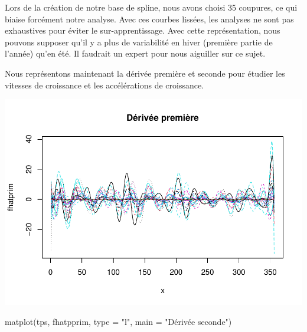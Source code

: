 \documentclass[
]{article}
\newenvironment{Shaded}{\begin{snugshade}}{\end{snugshade}}
\newcommand{\AttributeTok}[1]{\textcolor[rgb]{0.77,0.63,0.00}{#1}}
\newcommand{\CommentTok}[1]{\textcolor[rgb]{0.56,0.35,0.01}{\textit{#1}}}
\newcommand{\DecValTok}[1]{\textcolor[rgb]{0.00,0.00,0.81}{#1}}
\newcommand{\FunctionTok}[1]{\textcolor[rgb]{0.00,0.00,0.00}{#1}}
\newcommand{\NormalTok}[1]{#1}
\newcommand{\OtherTok}[1]{\textcolor[rgb]{0.56,0.35,0.01}{#1}}
\newcommand{\SpecialCharTok}[1]{\textcolor[rgb]{0.00,0.00,0.00}{#1}}
\newcommand{\StringTok}[1]{\textcolor[rgb]{0.31,0.60,0.02}{#1}}
\begin{document}
Lors de la création de notre base de spline, nous avons choisi 35
coupures, ce qui biaise forcément notre analyse. Avec ces courbes
lissées, les analyses ne sont pas exhaustives pour éviter le
sur-apprentissage. Avec cette représentation, nous pouvons supposer
qu'il y a plus de variabilité en hiver (première partie de l'année)
qu'en été. Il faudrait un expert pour nous aiguiller sur ce sujet.

Nous représentons maintenant la dérivée première et seconde pour étudier
les vitesses de croissance et les accélérations de croissance.

\begin{Shaded}
\end{Shaded}

\includegraphics{Projet_CHESNAIS_GUIBERT_files/figure-latex/unnamed-chunk-32-1.pdf}

\begin{Shaded}
\begin{Highlighting}[]
\FunctionTok{matplot}\NormalTok{(tps, fhatpprim, }\AttributeTok{type =} \StringTok{"l"}\NormalTok{,}
        \AttributeTok{main =} \StringTok{"Dérivée seconde"}\NormalTok{)}
\end{Highlighting}
\end{Shaded}
\end{document}

